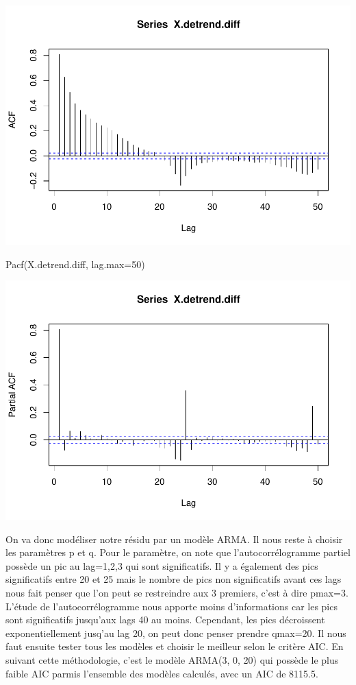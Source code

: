 \documentclass[
]{article}
\newenvironment{Shaded}{\begin{snugshade}}{\end{snugshade}}
\newcommand{\AttributeTok}[1]{\textcolor[rgb]{0.77,0.63,0.00}{#1}}
\newcommand{\DecValTok}[1]{\textcolor[rgb]{0.00,0.00,0.81}{#1}}
\newcommand{\FunctionTok}[1]{\textcolor[rgb]{0.00,0.00,0.00}{#1}}
\newcommand{\NormalTok}[1]{#1}
\begin{document}
\includegraphics{STA202_report_files/figure-latex/unnamed-chunk-23-1.pdf}

\begin{Shaded}
\begin{Highlighting}[]
\FunctionTok{Pacf}\NormalTok{(X.detrend.diff, }\AttributeTok{lag.max=}\DecValTok{50}\NormalTok{)}
\end{Highlighting}
\end{Shaded}

\includegraphics{STA202_report_files/figure-latex/unnamed-chunk-23-2.pdf}

On va donc modéliser notre résidu par un modèle ARMA. Il nous reste à
choisir les paramètres p et q. Pour le paramètre, on note que
l'autocorrélogramme partiel possède un pic au lag=1,2,3 qui sont
significatifs. Il y a également des pics significatifs entre 20 et 25
mais le nombre de pics non significatifs avant ces lags nous fait penser
que l'on peut se restreindre aux 3 premiers, c'est à dire pmax=3.
L'étude de l'autocorrélogramme nous apporte moins d'informations car les
pics sont significatifs jusqu'aux lags 40 au moins. Cependant, les pics
décroissent exponentiellement jusq'au lag 20, on peut donc penser
prendre qmax=20. Il nous faut ensuite tester tous les modèles et choisir
le meilleur selon le critère AIC. En suivant cette méthodologie, c'est
le modèle ARMA(3, 0, 20) qui possède le plus faible AIC parmis
l'ensemble des modèles calculés, avec un AIC de 8115.5.
\end{document}
